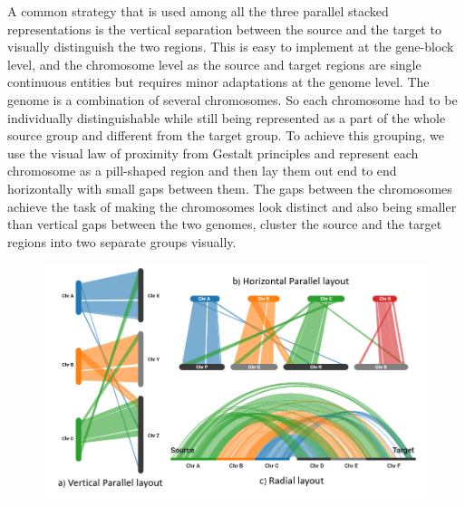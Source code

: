 A common strategy that is used among all the three parallel stacked representations is the vertical separation between the source and the target to visually distinguish the two regions. This is easy to implement at the gene-block level, and the chromosome level as the source and target regions are single continuous entities but requires minor adaptations at the genome level. The genome is a combination of several chromosomes. So each chromosome had to be individually distinguishable while still being represented as a part of the whole source group and different from the target group. To achieve this grouping, we use the visual law of proximity from Gestalt principles \cite{wertheimer1923untersuchungen} and represent each chromosome as a pill-shaped region and then lay them out end to end horizontally with small gaps between them. The gaps between the chromosomes achieve the task of making the chromosomes look distinct and also being smaller than vertical gaps between the two genomes, cluster the source and the target regions into two separate groups visually.

\begin{figure}
  \centering
  \includegraphics[width=.85\linewidth]{images/ch_4_layout.PNG}
  \label{fig:ch_4_layout}
\end{figure}


